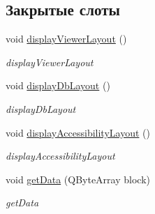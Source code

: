 \subsection*{Закрытые слоты}
\begin{DoxyCompactItemize}
\item 
void \hyperlink{classMainWindow_aa9f8c5c52b9f244da93730fa8af5ed34}{display\+Viewer\+Layout} ()
\begin{DoxyCompactList}\small\item\em display\+Viewer\+Layout \end{DoxyCompactList}\item 
void \hyperlink{classMainWindow_ab8b823d0d84f50c5f243720f44471a7f}{display\+Db\+Layout} ()
\begin{DoxyCompactList}\small\item\em display\+Db\+Layout \end{DoxyCompactList}\item 
void \hyperlink{classMainWindow_a0f4b0fd14e2af4b462223612ed22c695}{display\+Accessibility\+Layout} ()
\begin{DoxyCompactList}\small\item\em display\+Accessibility\+Layout \end{DoxyCompactList}\item 
void \hyperlink{classMainWindow_a3da5047b0ff5cf5c10a20174a99c420c}{get\+Data} (Q\+Byte\+Array block)
\begin{DoxyCompactList}\small\item\em get\+Data \end{DoxyCompactList}\end{DoxyCompactItemize}
